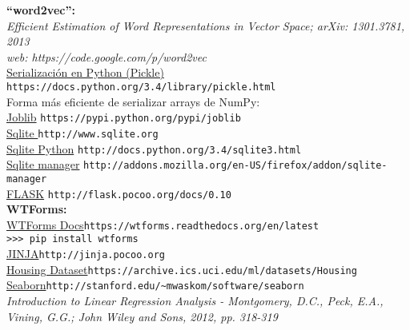 \documentclass[12pt]{article}
\begin{document}
\textbf{``word2vec'':}\\
\textit{Efficient Estimation of Word Representations in Vector Space; arXiv: 1301.3781, 2013\\
web: https://code.google.com/p/word2vec}\\

\href{https://docs.python.org/3.4/library/pickle.html}{Serialización en Python (Pickle)} \verb+https://docs.python.org/3.4/library/pickle.html+\\

Forma más eficiente de serializar arrays de NumPy:\\
\href{https://pypi.python.org/pypi/joblib}{Joblib} \verb+https://pypi.python.org/pypi/joblib+\\

\href{http://www.sqlite.org}{Sqlite }\verb+http://www.sqlite.org+\\

\href{http://docs.python.org/3.4/sqlite3.html}{Sqlite Python} \verb+http://docs.python.org/3.4/sqlite3.html+\\

\href{http://addons.mozilla.org/en-US/firefox/addon/sqlite-manager}{Sqlite manager} \verb+http://addons.mozilla.org/en-US/firefox/addon/sqlite-manager+\\

\href{http://flask.pocoo.org/docs/0.10}{FLASK} \verb+http://flask.pocoo.org/docs/0.10+\\

\textbf{WTForms:}\\
\href{https://wtforms.readthedocs.org/en/latest}{WTForms Docs}\verb+https://wtforms.readthedocs.org/en/latest+\\

\verb+>>> pip install wtforms+\\

\href{http://jinja.pocoo.org}{JINJA}\verb+http://jinja.pocoo.org+\\

\href{https://archive.ics.uci.edu/ml/datasets/Housing}{Housing Dataset}\verb+https://archive.ics.uci.edu/ml/datasets/Housing+\\

\href{http://stanford.edu/~mwaskom/software/seaborn}{Seaborn}\verb+http://stanford.edu/~mwaskom/software/seaborn+\\

\textit{Introduction to Linear Regression Analysis - Montgomery, D.C., Peck, E.A., Vining, G.G.; John Wiley and Sons, 2012, pp. 318-319}\\
\end{document}
